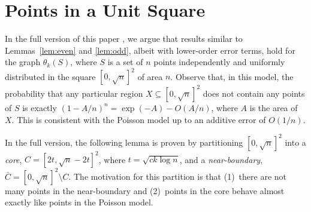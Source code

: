 \documentclass{patmorin}
\begin{document}
\section{Points in a Unit Square}

In the full version of this paper \cite{morin.verdonschot:on}, we argue
that results similar to Lemmas~\ref{lem:even} and \ref{lem:odd}, albeit
with lower-order error terms, hold for the graph $\theta_k(S)$, where
$S$ is a set of $n$ points independently and uniformly distributed in
the square $[0,\sqrt{n}]^2$ of area $n$.  Observe that, in this model,
the probability that any particular region $X\subseteq [0,\sqrt{n}]^2$
does not contain any points of $S$ is exactly $(1-A/n)^n=\exp(-A)-O(A/n)$,
where $A$ is the area of $X$.  This is consistent with the Poisson model
up to an additive error of $O(1/n)$.

In the full version, the following lemma is proven by partitioning
$[0,\sqrt{n}]^2$ into a \emph{core}, $C=[2t,\sqrt{n}-2t]^2$,
where $t=\sqrt{ck\log n}$, and a \emph{near-boundary},
$\bar{C}=[0,\sqrt{n}]^2\setminus C$.  The motivation
for this partition is that (1)~there are
not many points in the near-boundary and (2)~points in the core behave
almost exactly like points in the Poisson model.
\end{document}
